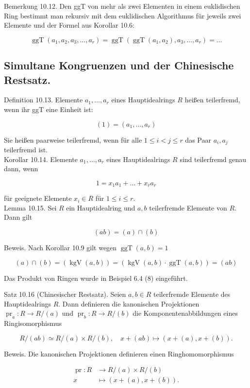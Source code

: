 \documentclass[10pt, letterpaper]{article}
\begin{document}
Bemerkung 10.12. Den ggT von mehr als zwei Elementen in einem euklidischen Ring bestimmt man rekursiv mit dem euklidischen Algorithmus für jeweils zwei Elemente und der Formel aus Korollar 10.6:

$$
\operatorname{ggT}\left(a_{1}, a_{2}, a_{3}, \ldots, a_{r}\right)=\operatorname{ggT}\left(\operatorname{ggT}\left(a_{1}, a_{2}\right), a_{3}, \ldots, a_{r}\right)=\ldots
$$

\subsection*{Simultane Kongruenzen und der Chinesische Restsatz.}
Definition 10.13. Elemente $a_{1}, \ldots, a_{r}$ eines Hauptidealrings $R$ heißen teilerfremd, wenn ihr ggT eine Einheit ist:

$$
(1)=\left(a_{1}, \ldots, a_{r}\right)
$$

Sie heißen paarweise teilerfremd, wenn für alle $1 \leq i<j \leq r$ das Paar $a_{i}, a_{j}$ teilerfremd ist.\\
Korollar 10.14. Elemente $a_{1}, \ldots, a_{r}$ eines Hauptidealrings $R$ sind teilerfremd genau dann, wenn

$$
1=x_{1} a_{1}+\ldots+x_{r} a_{r}
$$

für geeignete Elemente $x_{i} \in R$ für $1 \leq i \leq r$.\\
Lemma 10.15. Sei $R$ ein Hauptidealring und $a, b$ teilerfremde Elemente von $R$. Dann gilt

$$
(a b)=(a) \cap(b)
$$

Beweis. Nach Korollar 10.9 gilt wegen $\operatorname{ggT}(a, b)=1$

$$
(a) \cap(b)=(\operatorname{kgV}(a, b))=(\operatorname{kgV}(a, b) \cdot \operatorname{ggT}(a, b))=(a b)
$$

Das Produkt von Ringen wurde in Beispiel 6.4 (8) eingeführt.

Satz 10.16 (Chinesischer Restsatz). Seien $a, b \in R$ teilerfremde Elemente des Hauptidealrings $R$. Dann definieren die kanonischen Projektionen $\operatorname{pr}_{a}: R \rightarrow R /(a)$ und $\operatorname{pr}_{b}: R \rightarrow R /(b)$ die Komponentenabbildungen eines Ringisomorphismus

$$
R /(a b) \simeq R /(a) \times R /(b), \quad x+(a b) \mapsto(x+(a), x+(b)) .
$$

Beweis. Die kanonischen Projektionen definieren einen Ringhomomorphismus

$$
\begin{aligned}
\operatorname{pr}: R & \rightarrow R /(a) \times R /(b) \\
x & \mapsto(x+(a), x+(b)) .
\end{aligned}
$$
\end{document}
